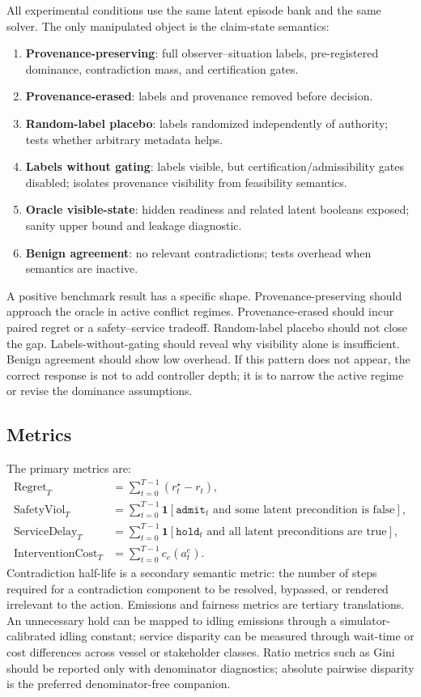 \documentclass[11pt]{article}
\newcommand{\1}{\mathbf{1}}
\theoremstyle{definition}
\theoremstyle{plain}
\theoremstyle{remark}
\begin{document}
All experimental conditions use the same latent episode bank and the same solver. The only manipulated object is the claim-state semantics:
\begin{enumerate}[leftmargin=1.6em]
  \item \textbf{Provenance-preserving}: full observer--situation labels, pre-registered dominance, contradiction mass, and certification gates.
  \item \textbf{Provenance-erased}: labels and provenance removed before decision.
  \item \textbf{Random-label placebo}: labels randomized independently of authority; tests whether arbitrary metadata helps.
  \item \textbf{Labels without gating}: labels visible, but certification/admissibility gates disabled; isolates provenance visibility from feasibility semantics.
  \item \textbf{Oracle visible-state}: hidden readiness and related latent booleans exposed; sanity upper bound and leakage diagnostic.
  \item \textbf{Benign agreement}: no relevant contradictions; tests overhead when semantics are inactive.
\end{enumerate}

A positive benchmark result has a specific shape. Provenance-preserving should approach the oracle in active conflict regimes. Provenance-erased should incur paired regret or a safety--service tradeoff. Random-label placebo should not close the gap. Labels-without-gating should reveal why visibility alone is insufficient. Benign agreement should show low overhead. If this pattern does not appear, the correct response is not to add controller depth; it is to narrow the active regime or revise the dominance assumptions.

\subsection{Metrics}

The primary metrics are:
\begin{align*}
\text{Regret}_T &= \sum_{t=0}^{T-1} (r_t^{\star}-r_t),\\
\text{SafetyViol}_T &= \sum_{t=0}^{T-1}\1[\texttt{admit}_t\text{ and some latent precondition is false}],\\
\text{ServiceDelay}_T &= \sum_{t=0}^{T-1}\1[\texttt{hold}_t\text{ and all latent preconditions are true}],\\
\text{InterventionCost}_T &= \sum_{t=0}^{T-1} c_e(a_t^e).
\end{align*}
Contradiction half-life is a secondary semantic metric: the number of steps required for a contradiction component to be resolved, bypassed, or rendered irrelevant to the action. Emissions and fairness metrics are tertiary translations. An unnecessary hold can be mapped to idling emissions through a simulator-calibrated idling constant; service disparity can be measured through wait-time or cost differences across vessel or stakeholder classes. Ratio metrics such as Gini should be reported only with denominator diagnostics; absolute pairwise disparity is the preferred denominator-free companion.
\end{document}
